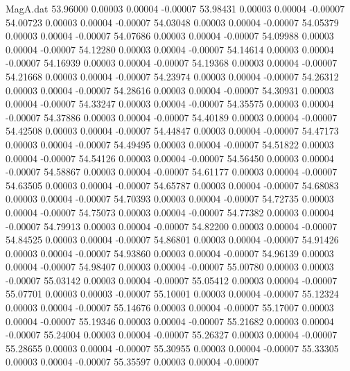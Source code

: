 \begin{filecontents}{MagA.dat}
  53.96000    0.00003    0.00004   -0.00007
  53.98431    0.00003    0.00004   -0.00007
  54.00723    0.00003    0.00004   -0.00007
  54.03048    0.00003    0.00004   -0.00007
  54.05379    0.00003    0.00004   -0.00007
  54.07686    0.00003    0.00004   -0.00007
  54.09988    0.00003    0.00004   -0.00007
  54.12280    0.00003    0.00004   -0.00007
  54.14614    0.00003    0.00004   -0.00007
  54.16939    0.00003    0.00004   -0.00007
  54.19368    0.00003    0.00004   -0.00007
  54.21668    0.00003    0.00004   -0.00007
  54.23974    0.00003    0.00004   -0.00007
  54.26312    0.00003    0.00004   -0.00007
  54.28616    0.00003    0.00004   -0.00007
  54.30931    0.00003    0.00004   -0.00007
  54.33247    0.00003    0.00004   -0.00007
  54.35575    0.00003    0.00004   -0.00007
  54.37886    0.00003    0.00004   -0.00007
  54.40189    0.00003    0.00004   -0.00007
  54.42508    0.00003    0.00004   -0.00007
  54.44847    0.00003    0.00004   -0.00007
  54.47173    0.00003    0.00004   -0.00007
  54.49495    0.00003    0.00004   -0.00007
  54.51822    0.00003    0.00004   -0.00007
  54.54126    0.00003    0.00004   -0.00007
  54.56450    0.00003    0.00004   -0.00007
  54.58867    0.00003    0.00004   -0.00007
  54.61177    0.00003    0.00004   -0.00007
  54.63505    0.00003    0.00004   -0.00007
  54.65787    0.00003    0.00004   -0.00007
  54.68083    0.00003    0.00004   -0.00007
  54.70393    0.00003    0.00004   -0.00007
  54.72735    0.00003    0.00004   -0.00007
  54.75073    0.00003    0.00004   -0.00007
  54.77382    0.00003    0.00004   -0.00007
  54.79913    0.00003    0.00004   -0.00007
  54.82200    0.00003    0.00004   -0.00007
  54.84525    0.00003    0.00004   -0.00007
  54.86801    0.00003    0.00004   -0.00007
  54.91426    0.00003    0.00004   -0.00007
  54.93860    0.00003    0.00004   -0.00007
  54.96139    0.00003    0.00004   -0.00007
  54.98407    0.00003    0.00004   -0.00007
  55.00780    0.00003    0.00003   -0.00007
  55.03142    0.00003    0.00004   -0.00007
  55.05412    0.00003    0.00004   -0.00007
  55.07701    0.00003    0.00003   -0.00007
  55.10001    0.00003    0.00004   -0.00007
  55.12324    0.00003    0.00004   -0.00007
  55.14676    0.00003    0.00004   -0.00007
  55.17007    0.00003    0.00004   -0.00007
  55.19346    0.00003    0.00004   -0.00007
  55.21682    0.00003    0.00004   -0.00007
  55.24004    0.00003    0.00004   -0.00007
  55.26327    0.00003    0.00004   -0.00007
  55.28655    0.00003    0.00004   -0.00007
  55.30955    0.00003    0.00004   -0.00007
  55.33305    0.00003    0.00004   -0.00007
  55.35597    0.00003    0.00004   -0.00007

\end{filecontents}
